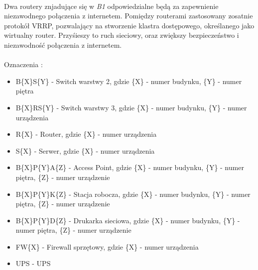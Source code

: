 \paragraph{}
Dwa routery znjadujące się w \textit{B1} odpowiedzialne będą za zapewnienie niezawodnego połączenia z internetem. Pomiędzy routerami zastosowany zosatnie protokół VRRP, pozwalający na stworzenie klastra dostępowego, określanego jako wirtualny router. Przyśieszy to ruch sieciowy, oraz zwiększy bezpieczeństwo i niezawodność połączenia z internetem.

\newpage
\paragraph{}
Oznaczenia :
\begin{itemize}
	\item B\{X\}S\{Y\} - Switch warstwy 2, gdzie \{X\} - numer budynku, \{Y\} - numer piętra
	\item B\{X\}RS\{Y\} - Switch warstwy 3, gdzie \{X\} - numer budynku, \{Y\} - numer urządzenia
	\item R\{X\} - Router, gdzie \{X\} - numer urządzenia
	\item S\{X\} - Serwer, gdzie \{X\} - numer urządzenia
	\item B\{X\}P\{Y\}A\{Z\} - Access Point, gdzie \{X\} - numer budynku, \{Y\} - numer piętra, \{Z\} - numer urządzenie
	\item B\{X\}P\{Y\}K\{Z\} - Stacja robocza, gdzie \{X\} - numer budynku, \{Y\} - numer piętra, \{Z\} - numer urządzenie
	\item B\{X\}P\{Y\}D\{Z\} - Drukarka sieciowa, gdzie \{X\} - numer budynku, \{Y\} - numer piętra, \{Z\} - numer urządzenie
	\item FW\{X\} - Firewall sprzętowy, gdzie \{X\} - numer urządzenia
	\item UPS - UPS
\end{itemize}

